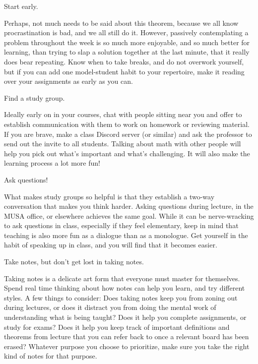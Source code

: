 \documentclass[../main.tex]{subfiles}
\begin{document}
\begin{proposition}
    Start early.
\end{proposition}
Perhaps, not much needs to be said about this theorem, because we all know procrastination is bad, and we all still do it. However, passively contemplating a problem throughout the week is so much more enjoyable, and so much better for learning, than trying to slap a solution together at the last minute, that it really does bear repeating. Know when to take breaks, and do not overwork yourself, but if you can add one model-student habit to your repertoire, make it reading over your assignments as early as you can.
\begin{proposition}
    Find a study group.
\end{proposition}
Ideally early on in your courses, chat with people sitting near you and offer to establish communication with them to work on homework or reviewing material. If you are brave, make a class Discord server (or similar) and ask the professor to send out the invite to all students. Talking about math with other people will help you pick out what's important and what's challenging. It will also make the learning process a lot more fun!
\begin{corollary}
    Ask questions!
\end{corollary}
What makes study groups so helpful is that they establish a two-way conversation that makes you think harder. Asking questions during lecture, in the MUSA office, or elsewhere achieves the same goal. While it can be nerve-wracking to ask questions in class, especially if they feel elementary, keep in mind that teaching is also more fun as a dialogue than as a monologue. Get yourself in the habit of speaking up in class, and you will find that it becomes easier.
\begin{proposition}
    Take notes, but don't get lost in taking notes.
\end{proposition}
Taking notes is a delicate art form that everyone must master for themselves. Spend real time thinking about how notes can help you learn, and try different styles. A few things to consider: Does taking notes keep you from zoning out during lectures, or does it distract you from doing the mental work of understanding what is being taught? Does it help you complete assignments, or study for exams? Does it help you keep track of important definitions and theorems from lecture that you can refer back to once a relevant board has been erased? Whatever purpose you choose to prioritize, make sure you take the right kind of notes for that purpose.
\end{document}
